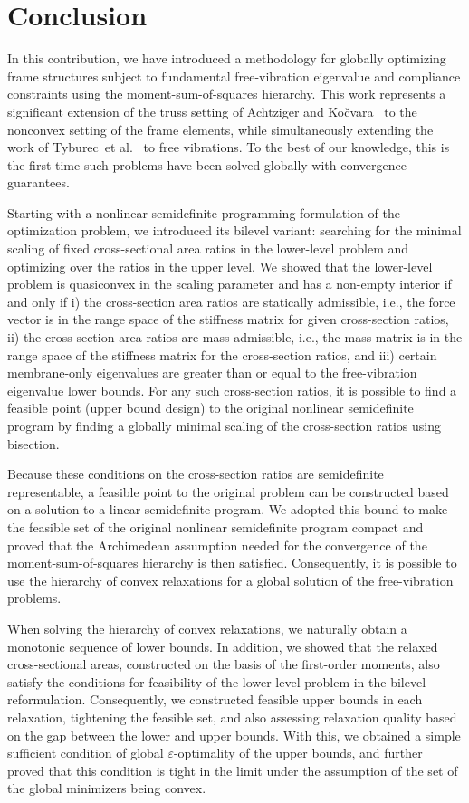 \documentclass[final,onefignum,onetabnum]{siamart220329}
\begin{document}
\section{Conclusion}

In this contribution, we have introduced a methodology for globally optimizing frame structures subject to fundamental free-vibration eigenvalue and compliance constraints using the moment-sum-of-squares hierarchy. This work represents a significant extension of the truss setting of Achtziger and Ko\v{c}vara~\cite{Achtziger2008} to the nonconvex setting of the frame elements, while simultaneously extending the work of Tyburec~et al.~\cite{Tyburec2023} to free vibrations. To the best of our knowledge, this is the first time such problems have been solved globally with convergence guarantees. 

Starting with a nonlinear semidefinite programming formulation of the optimization problem, we introduced its bilevel variant: searching for the minimal scaling of fixed cross-sectional area ratios in the lower-level problem and optimizing over the ratios in the upper level. We showed that the lower-level problem is quasiconvex in the scaling parameter and {has a non-empty interior} if and only if i) the cross-section area ratios are statically admissible, i.e., the force vector is in the range space of the stiffness matrix for given cross-section ratios,  ii) the cross-section area ratios are mass admissible, i.e., the mass matrix is in the range space of the stiffness matrix for the cross-section ratios, and iii) {certain} membrane-only eigenvalues are greater than or equal to the free-vibration eigenvalue lower bounds. For any such cross-section ratios, it is possible to find a feasible point (upper bound {design}) to the original nonlinear semidefinite program by finding a globally minimal scaling of the cross-section ratios using bisection.

Because these conditions on the cross-section ratios are semidefinite representable, a feasible point to the original problem can be constructed based on a solution to a linear semidefinite program. We adopted this bound to make the feasible set of the original nonlinear semidefinite program compact and proved that the Archimedean assumption needed for the convergence of the moment-sum-of-squares hierarchy is then satisfied. Consequently, it is possible to use the hierarchy of convex relaxations for a global solution of the free-vibration problems.

When solving the hierarchy of convex relaxations, we naturally obtain a monotonic sequence of lower bounds. In addition, we showed that the relaxed cross-sectional areas, constructed on the basis of the first-order moments, also satisfy the conditions for feasibility of the lower-level problem in the bilevel reformulation. Consequently, we constructed feasible upper bounds in each relaxation, tightening the feasible set, and also assess{ing} relaxation quality based on the gap between the lower and upper bounds. With this, we obtained a simple sufficient condition of global $\varepsilon$-optimality of the upper bounds, and further proved that this condition is tight in the limit under the assumption of the set of the global minimizers being convex.
\end{document}
